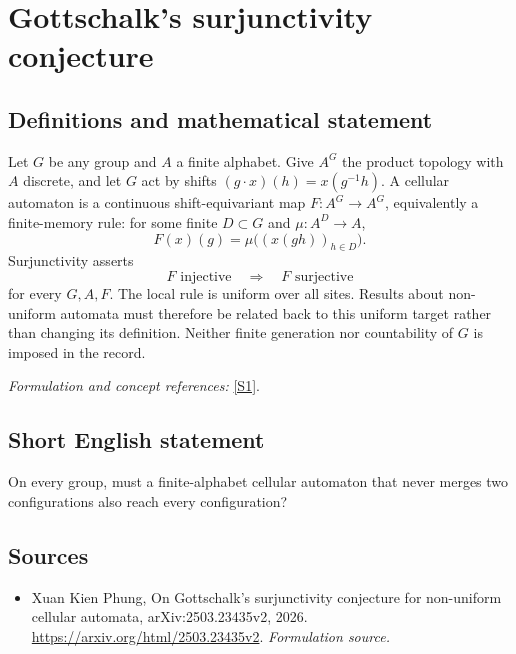 \documentclass[11pt]{article}
\begin{document}
\section*{\texorpdfstring{Gottschalk's surjunctivity conjecture}{Gottschalk's surjunctivity conjecture}}\label{491}
\subsection{Definitions and mathematical statement}
Let $G$ be any group and $A$ a finite alphabet. Give $A^G$ the product topology with $A$ discrete, and let $G$ act by shifts $(g\cdot x)(h)=x(g^{-1}h)$. A cellular automaton is a continuous shift-equivariant map $F:A^G\to A^G$, equivalently a finite-memory rule: for some finite $D\subset G$ and $\mu:A^D\to A$,
\[
 F(x)(g)=\mu\bigl((x(gh))_{h\in D}\bigr).
\]
Surjunctivity asserts
\[
 F\text{ injective}\quad\Longrightarrow\quad F\text{ surjective}
\]
for every $G,A,F$. The local rule is uniform over all sites. Results about non-uniform automata must therefore be related back to this uniform target rather than changing its definition. Neither finite generation nor countability of $G$ is imposed in the record.
\par\smallskip\textit{Formulation and concept references:} \href{https://arxiv.org/html/2503.23435v2}{[S1]}.

\subsection{Short English statement}
On every group, must a finite-alphabet cellular automaton that never merges two configurations also reach every configuration?
\subsection{Sources}
\begin{itemize}
\item[S1]Xuan Kien Phung, On Gottschalk's surjunctivity conjecture for non-uniform cellular automata, arXiv:2503.23435v2, 2026.
\url{https://arxiv.org/html/2503.23435v2}.
\textit{Formulation source.}
\end{itemize}
\end{document}
